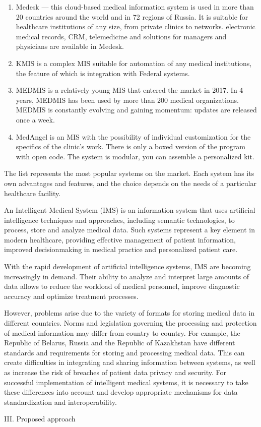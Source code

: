 \documentclass{article}
\begin{document}
\begin{multicols}{2}
\begin{enumerate}
\item[2)]Medesk — this cloud-based medical information
system is used in more than 20 countries around
the world and in 72 regions of Russia. It is suitable
for healthcare institutions of any size, from private
clinics to networks. electronic medical records,
CRM, telemedicine and solutions for managers and
physicians are available in Medesk.
\item[3)] KMIS is a complex MIS suitable for automation
of any medical institutions, the feature of which is
integration with Federal systems.
\item[4)]MEDMIS is a relatively young MIS that entered
the market in 2017. In 4 years, MEDMIS has
been used by more than 200 medical organizations.
MEDMIS is constantly evolving and gaining momentum: updates are released once a week.
 \item[5)]MedAngel is an MIS with the possibility of individual customization for the specifics of the clinic’s
work. There is only a boxed version of the program
with open code. The system is modular, you can
assemble a personalized kit.
\end{enumerate}
The list represents the most popular systems on the
market. Each system has its own advantages and features,
and the choice depends on the needs of a particular
healthcare facility.

An Intelligent Medical System (IMS) is an information
system that uses artificial intelligence techniques and
approaches, including semantic technologies, to process,
store and analyze medical data. Such systems represent
a key element in modern healthcare, providing effective
management of patient information, improved decisionmaking in medical practice and personalized patient care.

With the rapid development of artificial intelligence
systems, IMS are becoming increasingly in demand.
Their ability to analyze and interpret large amounts of
data allows to reduce the workload of medical personnel, improve diagnostic accuracy and optimize treatment
processes.

However, problems arise due to the variety of formats
for storing medical data in different countries. Norms and
legislation governing the processing and protection of
medical information may differ from country to country.
For example, the Republic of Belarus, Russia and the
Republic of Kazakhstan have different standards and
requirements for storing and processing medical data.
This can create difficulties in integrating and sharing
information between systems, as well as increase the
risk of breaches of patient data privacy and security. For
successful implementation of intelligent medical systems,
it is necessary to take these differences into account and
develop appropriate mechanisms for data standardization
and interoperability.
\begin{center}
    III. Proposed approach
\end{center}


\end{multicols}
\end{document}
